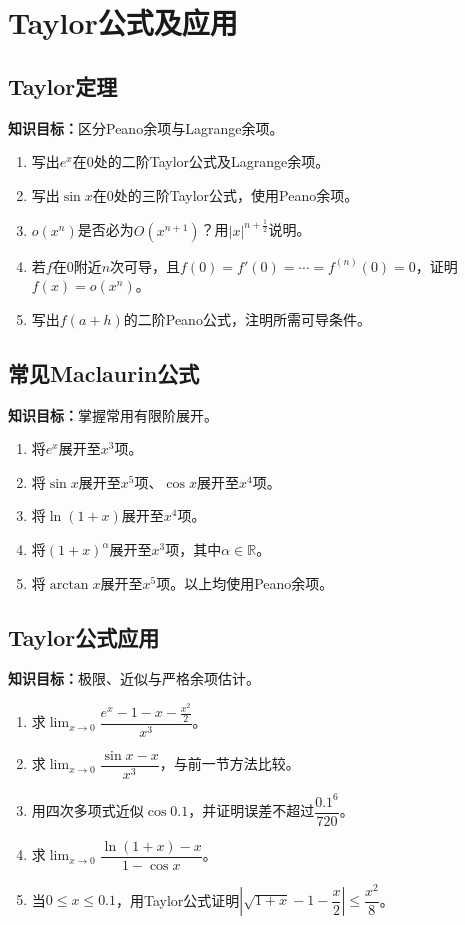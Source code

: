 \documentclass[11pt,a4paper,fontset=fandol]{ctexrep}
\newcommand{\goal}[1]{\textbf{知识目标：}#1\par}
\begin{document}
\section{Taylor公式及应用}
\subsection{Taylor定理}
\goal{区分Peano余项与Lagrange余项。}
\begin{enumerate}
\item 写出$e^x$在0处的二阶Taylor公式及Lagrange余项。
\item 写出$\sin x$在0处的三阶Taylor公式，使用Peano余项。
\item $o(x^n)$是否必为$O(x^{n+1})$？用$|x|^{n+\frac12}$说明。
\item 若$f$在0附近$n$次可导，且$f(0)=f'(0)=\cdots=f^{(n)}(0)=0$，证明$f(x)=o(x^n)$。
\item 写出$f(a+h)$的二阶Peano公式，注明所需可导条件。
\end{enumerate}
\subsection{常见Maclaurin公式}
\goal{掌握常用有限阶展开。}
\begin{enumerate}
\item 将$e^x$展开至$x^3$项。
\item 将$\sin x$展开至$x^5$项、$\cos x$展开至$x^4$项。
\item 将$\ln(1+x)$展开至$x^4$项。
\item 将$(1+x)^\alpha$展开至$x^3$项，其中$\alpha\in\mathbb R$。
\item 将$\arctan x$展开至$x^5$项。以上均使用Peano余项。
\end{enumerate}
\subsection{Taylor公式应用}
\goal{极限、近似与严格余项估计。}
\begin{enumerate}
\item 求$\lim_{x\to0}\dfrac{e^x-1-x-\frac{x^2}{2}}{x^3}$。
\item 求$\lim_{x\to0}\dfrac{\sin x-x}{x^3}$，与前一节方法比较。
\item 用四次多项式近似$\cos0.1$，并证明误差不超过$\dfrac{0.1^6}{720}$。
\item 求$\lim_{x\to0}\dfrac{\ln(1+x)-x}{1-\cos x}$。
\item 当$0\le x\le0.1$，用Taylor公式证明$\left|\sqrt{1+x}-1-\dfrac{x}{2}\right|\le\dfrac{x^2}{8}$。
\end{enumerate}
\end{document}

